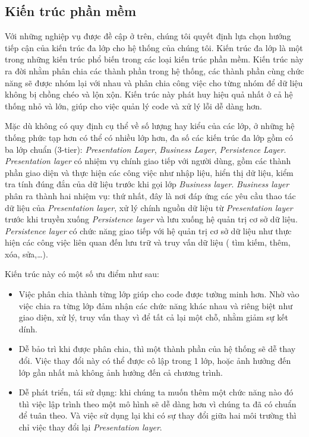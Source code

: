 \subsection{Kiến trúc phần mềm}
Với những nghiệp vụ được đề cập ở trên, chúng tôi quyết định lựa chọn hướng
tiếp cận của kiến trúc đa lớp cho hệ thống của chúng tôi. Kiến trúc đa lớp là
một trong những kiến trúc phổ biến trong các loại kiến trúc phần mềm. Kiến trúc
này ra đời nhằm phân chia các thành phần trong hệ thống, các thành phần cùng
chức năng sẽ được nhóm lại với nhau và phân chia công việc cho từng nhóm để dữ
liệu không bị chồng chéo và lộn xộn. Kiến trúc này phát huy hiệu quả nhất ở cả hệ 
thống nhỏ và lớn, giúp cho việc quản lý code và xử lý lỗi dễ
dàng hơn.
\par
Mặc dù không có quy định cụ thể về số lượng hay kiểu của các lớp, ở những hệ
thống phức tạp hơn có thể có nhiều lớp hơn, đa số các kiến trúc đa lớp gồm có
ba lớp chuẩn (3-tier): \emph{Presentation Layer}, \emph{Business Layer},
\emph{Persistence Layer}. \emph{Presentation layer} có nhiệm vụ chính giao tiếp với
người dùng, gồm các thành phần giao diện và thực hiện các công việc như nhập
liệu, hiển thị dữ liệu, kiểm tra tính đúng đắn của dữ liệu trước khi gọi lớp
\emph{Business layer}. \emph{Business layer} phân ra thành hai nhiệm vụ: thứ
nhất, đây là nơi đáp ứng các yêu cầu thao tác dữ liệu của \emph{Presentation
    layer}, xử lý chính nguồn dữ liệu từ \emph{Presentation layer} trước khi truyền
xuống \emph{Persistence layer} và lưu xuống hệ quản trị cơ sở dữ liệu. \emph{Persistence
    layer} có chức năng giao tiếp với hệ quản trị cơ sở dữ liệu như thực hiện các công việc
liên quan đến lưu trữ và truy vấn dữ liệu ( tìm kiếm, thêm, xóa, sửa,…).
\par
Kiến trúc này có một số ưu điểm như sau:
\begin{itemize}
    \item Việc phân chia thành từng lớp giúp cho code được tường minh hơn. Nhờ vào việc
          chia ra từng lớp đảm nhận các chức năng khác nhau và riêng biệt như giao diện,
          xử lý, truy vấn thay vì để tất cả lại một chỗ, nhằm giảm sự kết dính.
    \item Dễ bảo trì khi được phân chia, thì một thành phần của hệ thống sẽ dễ thay đổi.
          Việc thay đổi này có thể được cô lập trong 1 lớp, hoặc ảnh hưởng đến lớp gần
          nhất mà không ảnh hưởng đến cả chương trình.
    \item Dễ phát triển, tái sử dụng: khi chúng ta muốn thêm một chức năng nào đó thì
          việc lập trình theo một mô hình sẽ dễ dàng hơn vì chúng ta đã có chuẩn để tuân
          theo. Và việc sử dụng lại khi có sự thay đổi giữa hai môi trường thì chỉ việc
          thay đổi lại \emph{Presentation layer}.
\end{itemize}

